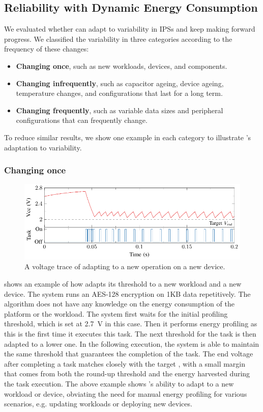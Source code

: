 \subsection{Reliability with Dynamic Energy Consumption}

We evaluated whether \nn{} can adapt to variability in IPSs and keep making forward progress.
We classified the variability in three categories according to the frequency of these changes: 
\begin{itemize}
    \item \textbf{Changing once}, such as new workloads, devices, and components.
    \item \textbf{Changing infrequently}, such as capacitor ageing, device ageing, temperature changes, and configurations that last for a long term.
    \item \textbf{Changing frequently}, such as variable data sizes and peripheral configurations that can frequently change. 
\end{itemize}
To reduce similar results, we show one example in each category to illustrate \nn{}'s adaptation to variability. 

\subsubsection{Changing once}

\begin{figure}
    \centering
    \includegraphics[width=\columnwidth]{ch5_optic/figures/v_trace/v_trace.pdf}
    \caption{A voltage trace of \nn{} adapting to a new operation on a new device. }
    \label{fig:v_trace}
\end{figure}

 shows an example of how \nn{} adapts its threshold to a new workload and a new device. 
The system runs an AES-128 encryption on 1KB data repetitively. 
The algorithm does not have any knowledge on the energy consumption of the platform or the workload.
The system first waits for the initial profiling threshold, which is set at \SI{2.7}{\volt} in this case. 
Then it performs energy profiling as this is the first time it executes this task. 
The next threshold for the task is then adapted to a lower one.
In the following execution, the system is able to maintain the same threshold that guarantees the completion of the task. 
The end voltage after completing a task matches closely with the target , with a small margin that comes from both the round-up threshold and the energy harvested during the task execution. 
The above example shows \nn{}'s ability to adapt to a new workload or device, obviating the need for manual energy profiling for various scenarios, e.g. updating workloads or deploying new devices. 

